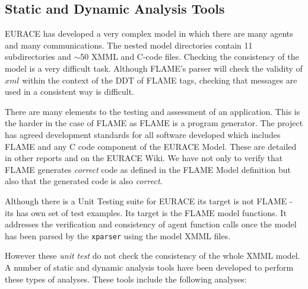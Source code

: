 
\subsection{Static and Dynamic Analysis Tools}

EURACE has developed a very complex model in which there are many agents and many communications. The nested model directories contain 11 subdirectories and $\sim$50 XMML and C-code files. Checking the consistency of the model is a very difficult task. Although FLAME's parser will check the validity of $xml$ within the context of the DDT of FLAME tags, checking that messages are used in a consistent way is difficult.


There are many elements to the testing and assessment of an application. This is the harder in the case of FLAME as FLAME is a program generator. The project has agreed development standards for all software developed which includes FLAME and any C code component of the EURACE Model. These are detailed in other reports and on the EURACE Wiki. We have not only to verify that FLAME generates \textit{correct} code as defined in the FLAME Model definition but also that the generated code is also \textit{correct}.


Although there is a Unit Testing suite for EURACE its target is not FLAME - its has own set of test examples. Its target is the FLAME model functions. It addresses the verification and consistency of agent function calls once the model has been parsed by the \texttt{xparser} using the model XMML files.


However these \textit{unit test} do not check the consistency of the whole XMML model. A number of static and dynamic analysis tools have been developed to perform these types of analyses. These tools include the following analyses:

